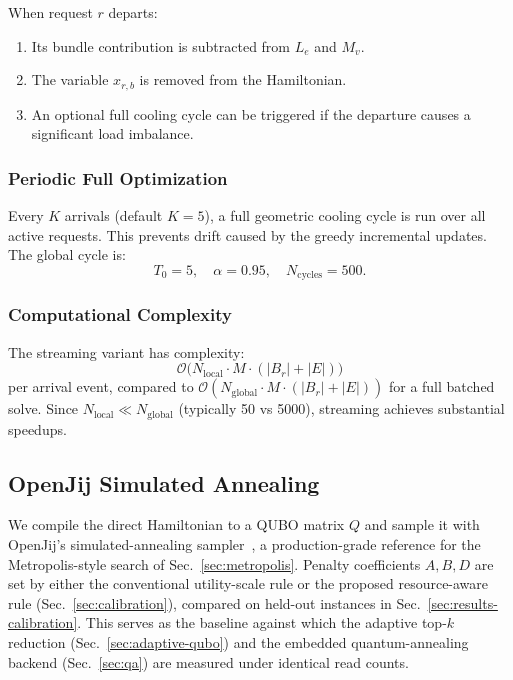 \documentclass[10pt,a4paper]{article}
\begin{document}
When request $r$ departs:
\begin{enumerate}
  \item Its bundle contribution is subtracted from $L_e$ and $M_v$.
  \item The variable $x_{r,b}$ is removed from the Hamiltonian.
  \item An optional full cooling cycle can be triggered if the
    departure causes a significant load imbalance.
\end{enumerate}

\subsubsection{Periodic Full Optimization}

Every $K$ arrivals (default $K = 5$), a full geometric cooling cycle
is run over all active requests.  This prevents drift caused by the
greedy incremental updates.  The global cycle is:
\begin{equation}
  T_0 = 5,\quad \alpha = 0.95,\quad N_{\text{cycles}} = 500.
\end{equation}

\subsubsection{Computational Complexity}

The streaming variant has complexity:
\begin{equation}
  \mathcal{O}\bigl(N_{\text{local}} \cdot M \cdot (|B_r| + |E|)\bigr)
\end{equation}
per arrival event, compared to $\mathcal{O}(N_{\text{global}} \cdot M
\cdot (|B_r| + |E|))$ for a full batched solve.  Since
$N_{\text{local}} \ll N_{\text{global}}$ (typically 50 vs 5000),
streaming achieves substantial speedups.

\subsection{OpenJij Simulated Annealing}
\label{sec:openjij}

We compile the direct Hamiltonian to a QUBO matrix $Q$ and sample it
with OpenJij's simulated-annealing sampler~\cite{openjij}, a
production-grade reference for the Metropolis-style search of
Sec.~\ref{sec:metropolis}.  Penalty coefficients $A,B,D$ are set by
either the conventional utility-scale rule or the proposed
resource-aware rule (Sec.~\ref{sec:calibration}), compared on held-out
instances in Sec.~\ref{sec:results-calibration}.  This serves as the
baseline against which the adaptive top-$k$ reduction
(Sec.~\ref{sec:adaptive-qubo}) and the embedded quantum-annealing
backend (Sec.~\ref{sec:qa}) are measured under identical read counts.
\end{document}
